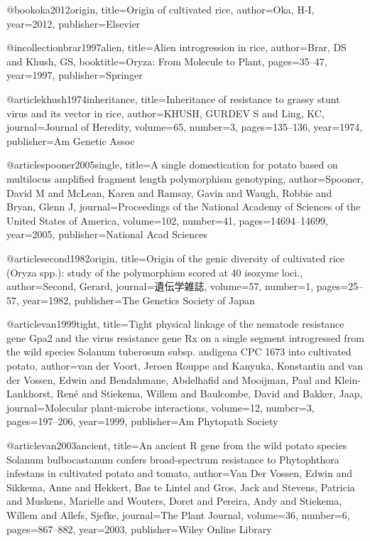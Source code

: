 @book{oka2012origin,
  title={Origin of cultivated rice},
  author={Oka, H-I},
  year={2012},
  publisher={Elsevier}
}

@incollection{brar1997alien,
  title={Alien introgression in rice},
  author={Brar, DS and Khush, GS},
  booktitle={Oryza: From Molecule to Plant},
  pages={35--47},
  year={1997},
  publisher={Springer}
}

@article{khush1974inheritance,
  title={Inheritance of resistance to grassy stunt virus and its vector in rice},
  author={KHUSH, GURDEV S and Ling, KC},
  journal={Journal of Heredity},
  volume={65},
  number={3},
  pages={135--136},
  year={1974},
  publisher={Am Genetic Assoc}
}

@article{spooner2005single,
  title={A single domestication for potato based on multilocus amplified fragment length polymorphism genotyping},
  author={Spooner, David M and McLean, Karen and Ramsay, Gavin and Waugh, Robbie and Bryan, Glenn J},
  journal={Proceedings of the National Academy of Sciences of the United States of America},
  volume={102},
  number={41},
  pages={14694--14699},
  year={2005},
  publisher={National Acad Sciences}
}

@article{second1982origin,
  title={Origin of the genic diversity of cultivated rice (Oryza spp.): study of the polymorphism scored at 40 isozyme loci.},
  author={Second, Gerard},
  journal={遺伝学雑誌},
  volume={57},
  number={1},
  pages={25--57},
  year={1982},
  publisher={The Genetics Society of Japan}
}

@article{van1999tight,
  title={Tight physical linkage of the nematode resistance gene Gpa2 and the virus resistance gene Rx on a single segment introgressed from the wild species Solanum tuberosum subsp. andigena CPC 1673 into cultivated potato},
  author={van der Voort, Jeroen Rouppe and Kanyuka, Konstantin and van der Vossen, Edwin and Bendahmane, Abdelhafid and Mooijman, Paul and Klein-Lankhorst, Ren{\'e} and Stiekema, Willem and Baulcombe, David and Bakker, Jaap},
  journal={Molecular plant-microbe interactions},
  volume={12},
  number={3},
  pages={197--206},
  year={1999},
  publisher={Am Phytopath Society}
}

@article{van2003ancient,
  title={An ancient R gene from the wild potato species Solanum bulbocastanum confers broad-spectrum resistance to Phytophthora infestans in cultivated potato and tomato},
  author={Van Der Vossen, Edwin and Sikkema, Anne and Hekkert, Bas te Lintel and Gros, Jack and Stevens, Patricia and Muskens, Marielle and Wouters, Doret and Pereira, Andy and Stiekema, Willem and Allefs, Sjefke},
  journal={The Plant Journal},
  volume={36},
  number={6},
  pages={867--882},
  year={2003},
  publisher={Wiley Online Library}
}

